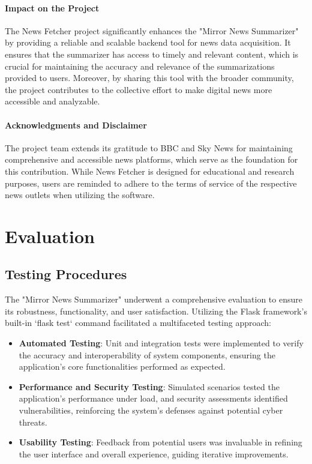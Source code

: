 \documentclass[10pt]{article}
\begin{document}
\paragraph{Impact on the Project}
The News Fetcher project significantly enhances the "Mirror News Summarizer" by providing a reliable and scalable backend tool for news data acquisition. It ensures that the summarizer has access to timely and relevant content, which is crucial for maintaining the accuracy and relevance of the summarizations provided to users. Moreover, by sharing this tool with the broader community, the project contributes to the collective effort to make digital news more accessible and analyzable.

\paragraph{Acknowledgments and Disclaimer}
The project team extends its gratitude to BBC and Sky News for maintaining comprehensive and accessible news platforms, which serve as the foundation for this contribution. While News Fetcher is designed for educational and research purposes, users are reminded to adhere to the terms of service of the respective news outlets when utilizing the software.

\section{Evaluation}

\subsection{Testing Procedures}

The "Mirror News Summarizer" underwent a comprehensive evaluation to ensure its robustness, functionality, and user satisfaction. Utilizing the Flask framework's built-in `flask test` command facilitated a multifaceted testing approach:

\begin{itemize}
    \item \textbf{Automated Testing}: Unit and integration tests were implemented to verify the accuracy and interoperability of system components, ensuring the application's core functionalities performed as expected.
    
    \item \textbf{Performance and Security Testing}: Simulated scenarios tested the application's performance under load, and security assessments identified vulnerabilities, reinforcing the system's defenses against potential cyber threats.
    
    \item \textbf{Usability Testing}: Feedback from potential users was invaluable in refining the user interface and overall experience, guiding iterative improvements.
\end{itemize}
\end{document}
